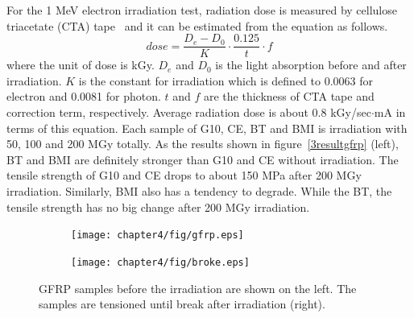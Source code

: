 For the 1 MeV electron irradiation test, radiation dose is measured by cellulose triacetate (CTA) tape~\cite{cta} and it can be estimated from the equation as follows.
\begin{equation}
 dose = \frac{D_e - D_0}{K} \cdot \frac{0.125}{t} \cdot f
\end{equation}
where the unit of dose is kGy.
$D_e$ and $D_0$ is the light absorption before and after irradiation.
$K$ is the constant for irradiation which is defined to 0.0063 for electron and 0.0081 for photon.
$t$ and $f$ are the thickness of CTA tape and correction term, respectively.
Average radiation dose is about 0.8 kGy/sec$\cdot$mA in terms of this equation.
Each sample of G10, CE, BT and BMI is irradiation with 50, 100 and 200 MGy totally.
As the results shown in figure~\ref{3resultgfrp} (left), BT and BMI are definitely stronger than G10 and CE without irradiation.
The tensile strength of G10 and CE drops to about 150 MPa after 200 MGy irradiation.
Similarly, BMI also has a tendency to degrade.
While the BT, the tensile strength has no big change after 200 MGy irradiation.
 \begin{figure}[H]
  \begin{subfigure}{0.22\textwidth}
   \centering
   \texttt{[image: chapter4/fig/gfrp.eps]}
  \end{subfigure}
  \hspace{0.2\textwidth}
  \begin{subfigure}{0.22\textwidth}
   \centering
   \texttt{[image: chapter4/fig/broke.eps]}
  \end{subfigure}
  \caption{GFRP samples before the irradiation are shown on the left. The samples are tensioned until break after irradiation (right).}
  \label{3samplegfrp}
 \end{figure}
